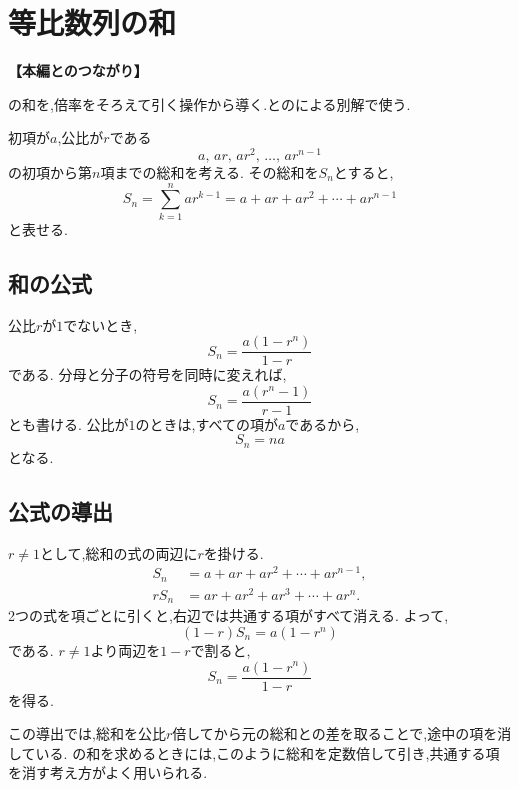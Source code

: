 
\section{等比数列の和}\label{節：等比数列の総和とその導出}
  \noindent\textbf{【本編とのつながり】}\par
  の和を,倍率をそろえて引く操作から導く.とのによる別解で使う.

  初項が$a$,公比が$r$である
  \[
    a,\,ar,\,ar^2,\,\ldots,\,ar^{n-1}
  \]
  の初項から第$n$項までの総和を考える.
  その総和を$S_n$とすると,
  \[
    S_n
    =\sum_{k=1}^{n} ar^{k-1}
    =a+ar+ar^2+\cdots+ar^{n-1}
  \]
  と表せる.

  \subsection{和の公式}\label{節：等比数列の総和とその導出：総和の公式}
    公比$r$が$1$でないとき,
    \[
      S_n=\frac{a(1-r^n)}{1-r}
    \]
    である.
    分母と分子の符号を同時に変えれば,
    \[
      S_n=\frac{a(r^n-1)}{r-1}
    \]
    とも書ける.
    公比が$1$のときは,すべての項が$a$であるから,
    \[
      S_n=na
    \]
    となる.

  \subsection{公式の導出}\label{節：等比数列の総和とその導出：公式の導出}
    $r\ne1$として,総和の式の両辺に$r$を掛ける.
    \begin{align*}
      S_n
        &=a+ar+ar^2+\cdots+ar^{n-1},\\
      rS_n
        &=ar+ar^2+ar^3+\cdots+ar^n.
    \end{align*}
    2つの式を項ごとに引くと,右辺では共通する項がすべて消える.
\BookMathLayout{\[
    \begin{array}{rrrl}
        &S_{n}={}&a+&\hspace{-0.75em}ar+ar^2+\cdots+ar^{n-1}\\
      -\,) & rS_n={}&{}&\hspace{-0.75em}ar+ar^2+ar^3+\cdots+ar^{n}\\ \hline
        & (1-r)S_n={}&{}&\hspace{-0.75em}a-ar^n
    \end{array}
    \]}{
\[
\begin{array}{rl}
S_n={}&a+ar+ar^2+\cdots\\
     &{}+ar^{n-1}\\
-\,)\ rS_n={}&ar+ar^2+ar^3+\cdots\\
     &{}+ar^n\\ \hline
(1-r)S_n={}&a-ar^n
\end{array}
\]
}
    よって,
    \[
      (1-r)S_n=a(1-r^n)
    \]
    である.
    $r\ne1$より両辺を$1-r$で割ると,
    \[
      S_n=\frac{a(1-r^n)}{1-r}
    \]
    を得る.

    この導出では,総和を公比$r$倍してから元の総和との差を取ることで,途中の項を消している.
    の和を求めるときには,このように総和を定数倍して引き,共通する項を消す考え方がよく用いられる.

